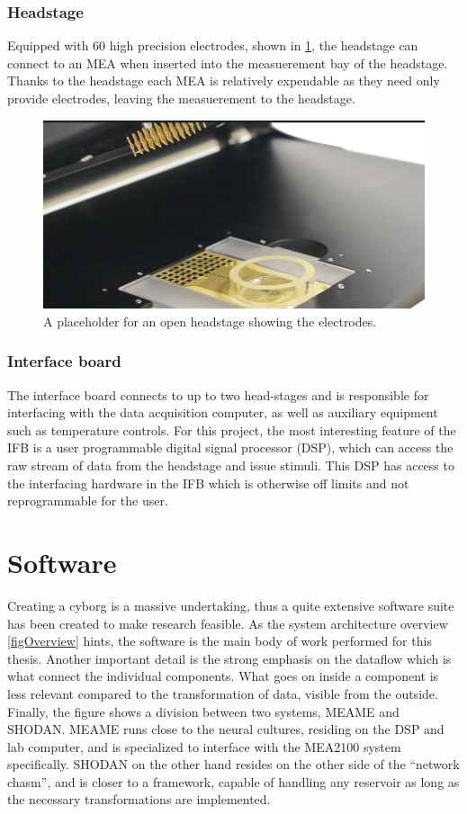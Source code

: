 \subsubsection{Headstage}
Equipped with 60 high precision electrodes, shown in \ref{openHeadstage}, the
headstage can connect to an MEA when inserted into the measuerement bay of the
headstage.
Thanks to the headstage each MEA is relatively expendable as they need only
provide electrodes, leaving the measuerement to the headstage.
\begin{figure}[h!]
  \centering
  \includegraphics[width=1\textwidth]{fig/hs_placeholder.png}
  \caption{
    A placeholder for an open headstage showing the electrodes.
  }
  \label{openHeadstage}
\end{figure}
\subsubsection{Interface board}
The interface board connects to up to two head-stages and is responsible for
interfacing with the data acquisition computer, as well as auxiliary equipment
such as temperature controls.
For this project, the most interesting feature of the IFB is a user programmable
digital signal processor (DSP), which can access the raw stream of data from the
headstage and issue stimuli.
This DSP has access to the interfacing hardware in the IFB which is otherwise
off limits and not reprogrammable for the user.
\section{Software}
Creating a cyborg is a massive undertaking, thus a quite extensive software
suite has been created to make research feasible.
As the system architecture overview \ref{figOverview} hints, the software is the
main body of work performed for this thesis.
Another important detail is the strong emphasis on the dataflow which is what
connect the individual components.
What goes on inside a component is less relevant compared to the transformation
of data, visible from the outside.
Finally, the figure shows a division between two systems, MEAME and SHODAN.
MEAME runs close to the neural cultures, residing on the DSP and lab computer,
and is specialized to interface with the MEA2100 system specifically.
SHODAN on the other hand resides on the other side of the ``network chasm'', and
is closer to a framework, capable of handling any reservoir as long as the
necessary transformations are implemented.
